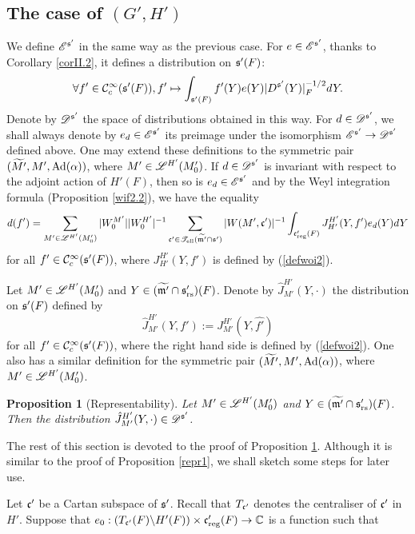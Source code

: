 \documentclass[a4paper]{amsart}
\newcommand{\mse}{\mathscr{E}}\newcommand{\msf}{\mathscr{F}}\newcommand{\msg}{\mathscr{G}}\newcommand{\msh}{\mathscr{H}}
\newcommand{\fm}{{\mathfrak{m}}} \newcommand{\fn}{{\mathfrak{n}}}\newcommand{\fo}{{\mathfrak{o}}} \newcommand{\fp}{{\mathfrak{p}}}
\newcommand{\wt}{\widetilde}                        \newcommand{\wh}{\widehat}                      \newcommand{\wpair}[1]{\left\{{#1}\right\}}
\newtheorem{prop}[thm]{Proposition}
\theoremstyle{definition}
\theoremstyle{remark}
\numberwithin{equation}{subsection}
\begin{document}
\subsection{The case of $(G',H')$}

We define $\mse^{\fs'}$ in the same way as the previous case. For $e\in\mse^{\fs'}$, thanks to Corollary \ref{corII.2}, it defines a distribution on ${\mathfrak{s}}'(F)$:
\begin{equation}\label{defV.6.2}
 \forall f'\in{\mathcal {C}}_c^\infty({\mathfrak{s}}'(F)), f'\mapsto\int_{{\mathfrak{s}}'(F)} f'(Y)e(Y)|D^{{\mathfrak{s}}'}(Y)|_F^{-1/2}dY. 
\end{equation}
Denote by $\mathscr{D}^{{\mathfrak{s}}'}$ the space of distributions obtained in this way. For $d\in\mathscr{D}^{{\mathfrak{s}}'}$, we shall always denote by $e_d\in\mse^{\fs'}$ its preimage under the isomorphism $\mse^{\fs'}\ra\msd^{\fs'}$ defined above. One may extend these definitions to the symmetric pair $(\wt{M'}, M', \Ad(\alpha))$, where $M'\in\mathscr{L}^{H'}(M'_0)$. If $d\in\mathscr{D}^{{\mathfrak{s}}'}$ is invariant with respect to the adjoint action of $H'(F)$, then so is $e_d\in\mse^{\fs'}$ and by the Weyl integration formula (Proposition \ref{wif2.2}), we have the equality
\begin{equation}\label{equV.6inv2}
 d(f')=\sum_{M'\in\msl^{H'}(M'_0)} |W_0^{M'}||W_0^{H'}|^{-1} \sum_{\fc'\in\mst_\el(\wt{\fm'}\cap\fs')} |W(M', \fc')|^{-1} \int_{\fc'_\reg(F)} J_{H'}^{H'}(Y, f') e_d(Y) dY 
\end{equation}
for all $f'\in{\mathcal {C}}_c^\infty({\mathfrak{s}}'(F))$, where $J_{H'}^{H'}(Y, f')$ is defined by (\ref{defwoi2}). 

Let $M'\in\mathscr{L}^{H'}(M'_0)$ and $Y\in(\wt{\fm'}\cap\fs'_\rs)(F)$. Denote by $\hat{J}_{M'}^{H'}(Y, \cdot)$ the distribution on ${\mathfrak{s}}'(F)$ defined by
$$ \hat{J}_{M'}^{H'}(Y, f'):=J_{M'}^{H'}(Y, \hat{f'}) $$
for all $f'\in{\mathcal {C}}_c^\infty({\mathfrak{s}}'(F))$, where the right hand side is defined by (\ref{defwoi2}). One also has a similar definition for the symmetric pair $(\wt{M'}, M', \Ad(\alpha))$, where $M'\in\mathscr{L}^{H'}(M'_0)$. 

\begin{prop}[Representability]\label{repr2}
Let $M'\in\mathscr{L}^{H'}(M'_0)$ and $Y\in(\wt{\fm'}\cap\fs'_\rs)(F)$. Then the distribution $\hat{J}_{M'}^{H'}(Y, \cdot)\in\mathscr{D}^{{\mathfrak{s}}'}$. 
\end{prop}

The rest of this section is devoted to the proof of Proposition \ref{repr2}. Although it is similar to the proof of Proposition \ref{repr1}, we shall sketch some steps for later use. 

Let ${\mathfrak{c}}'$ be a Cartan subspace of ${\mathfrak{s}}'$. Recall that $T_{{\mathfrak{c}}'}$ denotes the centraliser of ${\mathfrak{c}}'$ in $H'$. Suppose that $e_0: (T_{{\mathfrak{c}}'}(F)\backslash H'(F))\times {\mathfrak{c}}'_{\mathrm{reg}}(F)\rightarrow{\mathbb {C}}$ is a function such that
\end{document}
